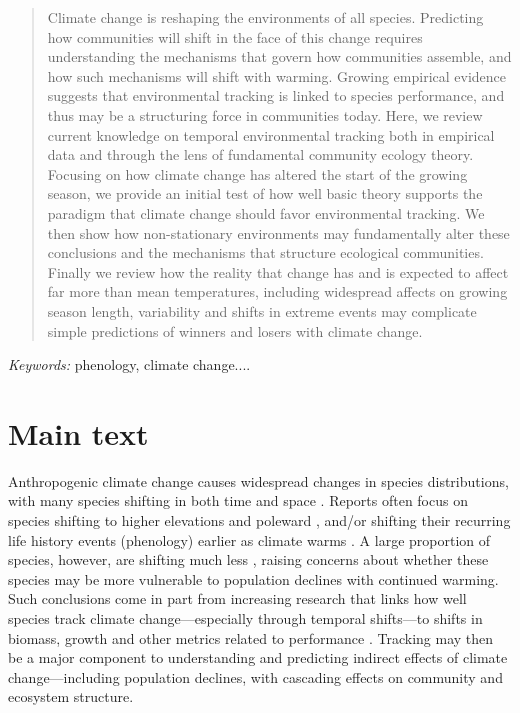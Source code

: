 \documentclass[11pt,letterpaper]{article}
\begin{document}
\begin{abstract} 
Climate change is reshaping the environments of all species. Predicting how communities will shift in the face of this change requires understanding the mechanisms that govern how communities assemble, and how such mechanisms will shift with warming. Growing empirical evidence suggests that environmental tracking is linked to species performance, and thus may be a structuring force in communities today. Here, we review current knowledge on temporal environmental tracking both in empirical data and through the lens of fundamental community ecology theory. Focusing on how climate change has altered the start of the growing season, we provide an initial test of how well basic theory supports the paradigm that climate change should favor environmental tracking. 
We then show how non-stationary environments may fundamentally alter these conclusions and the mechanisms that structure ecological communities. Finally we review how the reality that change has and is expected to affect far more than mean temperatures, including widespread affects on growing season length, variability and shifts in extreme events may complicate simple predictions of winners and losers with climate change. 
\end{abstract}
\noindent \emph{Keywords:} phenology, climate change....\\



\section{Main text}
Anthropogenic climate change causes widespread changes in species distributions, with many species shifting in both time and space \citep{IPCC:2014sm}. Reports often focus on species shifting to higher elevations and poleward \citep{Chen2011}, and/or shifting their recurring life history events (phenology) earlier as climate warms \citep{Menzel:2006sq,Wolkovich:2012n,cohen2018}. A large proportion of species, however, are shifting much less \citep{Cook:2012pnas}, raising concerns about whether these species may be more vulnerable to population declines with continued warming. Such conclusions come in part from increasing research that links how well species track climate change---especially through temporal shifts---to shifts in biomass, growth and other metrics related to performance \citep{Cleland:2012}. Tracking may then be a major component to understanding and predicting indirect effects of climate change---including population declines, with cascading effects on community and ecosystem structure.
\end{document}

